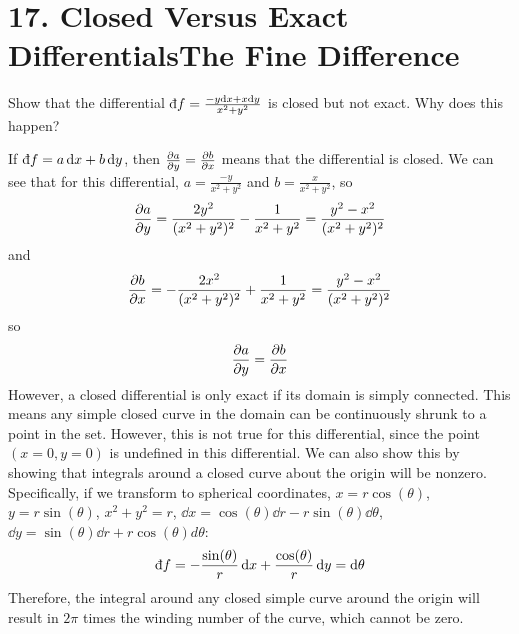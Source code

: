 \documentclass[a4paper,twoside]{article}
\begin{document}
\section*{17. Closed Versus Exact Differentials\textemdash The Fine Difference}
Show that the differential $ \dbar{f} = \frac{-y \dd{x} + x \dd{y}}{x^2 + y^2} $ is closed but not exact. Why does this happen?
\begin{problem}
    If $ \dbar{f} = a \dd{x} + b \dd{y} $, then $ \pdv{a}{y} = \pdv{b}{x} $ means that the differential is closed. We can see that for this differential, $ a = \frac{-y}{x^2 + y^2} $ and $ b = \frac{x}{x^2 + y^2} $, so
    \begin{equation}
        \pdv{a}{y} = \frac{2y^2}{(x^2 + y^2)^2} - \frac{1}{x^2 + y^2} = \frac{y^2 - x^2}{(x^2 + y^2)^2}
    \end{equation}
    and
    \begin{equation}
        \pdv{b}{x} = - \frac{2 x^2}{(x^2 + y^2)^2} + \frac{1}{x^2 + y^2} = \frac{y^2 - x^2}{(x^2 + y^2)^2}
    \end{equation}
    so
    \begin{equation}
        \pdv{a}{y} =  \pdv{b}{x}
    \end{equation}
    However, a closed differential is only exact if its domain is simply connected. This means any simple closed curve in the domain can be continuously shrunk to a point in the set. However, this is not true for this differential, since the point $ (x=0, y=0) $ is undefined in this differential. We can also show this by showing that integrals around a closed curve about the origin will be nonzero. Specifically, if we transform to spherical coordinates, $ x = r \cos(\theta) $, $ y = r \sin(\theta) $, $ x^2 + y^2 = r $, $ \dd{x} = \cos(\theta) \dd{r} - r \sin(\theta) \dd{\theta} $, $ \dd{y} = \sin(\theta) \dd{r} + r \cos(\theta) d \theta $:
    \begin{equation}
        \dbar{f} = - \frac{\sin(\theta)}{r} \dd{x} + \frac{\cos(\theta)}{r} \dd{y} = \dd{\theta}
    \end{equation}
    Therefore, the integral around any closed simple curve around the origin will result in $ 2 \pi $ times the winding number of the curve, which cannot be zero.
\end{problem}
\end{document}
